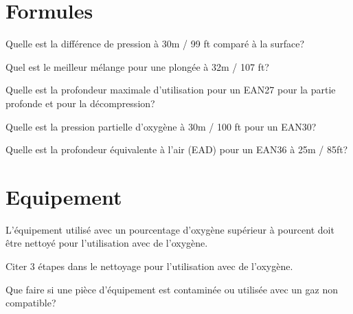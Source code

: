 \documentclass[english,12pt,a4paper]{article}
\begin{document}
	\section{Formules}
	\begin{outline}
	\1 Quelle est la différence de pression à 30m / 99 ft comparé à la surface?
			\2 \hspace{-2em}\hrulefill
			\2 \hspace{-2em}\hrulefill
			\2 \hspace{-2em}\hrulefill

	\1 Quel est le meilleur mélange pour une plongée à 32m / 107 ft?
			\2 \hspace{-2em}\hrulefill
			\2 \hspace{-2em}\hrulefill
			\2 \hspace{-2em}\hrulefill

	\1 Quelle est la profondeur maximale d'utilisation pour un EAN27 pour la partie profonde et pour la décompression?
			\2 \hspace{-2em}\hrulefill
			\2 \hspace{-2em}\hrulefill
			\2 \hspace{-2em}\hrulefill

	\1 Quelle est la pression partielle d'oxygène à 30m / 100 ft pour un EAN30?
			\2 \hspace{-2em}\hrulefill
			\2 \hspace{-2em}\hrulefill
			\2 \hspace{-2em}\hrulefill

	\1 Quelle est la profondeur équivalente à l'air (EAD) pour un EAN36 à 25m / 85ft?
			\2 \hspace{-2em}\hrulefill
			\2 \hspace{-2em}\hrulefill
			\2 \hspace{-2em}\hrulefill
	\end{outline}
	\pagebreak

	\section{Equipement}
	\begin{outline}
		\1 L'équipement utilisé avec un pourcentage d'oxygène supérieur à \underline{\hspace{1.5cm}} pourcent doit être nettoyé pour l'utilisation avec de l'oxygène.

		\1 Citer 3 étapes dans le nettoyage pour l'utilisation avec de l'oxygène.
			\2 \hspace{-2em}\hrulefill
			\2 \hspace{-2em}\hrulefill
			\2 \hspace{-2em}\hrulefill

		\1 Que faire si une pièce d'équipement est contaminée ou utilisée avec un gaz non compatible?
			\2 \hspace{-2em}\hrulefill
			\2 \hspace{-2em}\hrulefill
			\2 \hspace{-2em}\hrulefill
	\end{outline}
	\pagebreak
\end{document}
